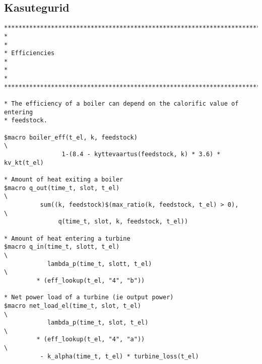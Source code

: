 \subsection{Kasutegurid}
\begin{verbatim}
********************************************************************************
*                                                                              *
* Efficiencies                                                                 *
*                                                                              *
********************************************************************************

* The efficiency of a boiler can depend on the calorific value of entering
* feedstock.

$macro boiler_eff(t_el, k, feedstock)                                          \
                1-(8.4 - kyttevaartus(feedstock, k) * 3.6) * kv_kt(t_el)

* Amount of heat exiting a boiler
$macro q_out(time_t, slot, t_el)                                               \
          sum((k, feedstock)$(max_ratio(k, feedstock, t_el) > 0),              \
               q(time_t, slot, k, feedstock, t_el))

* Amount of heat entering a turbine
$macro q_in(time_t, slott, t_el)                                               \
            lambda_p(time_t, slott, t_el)                                      \
         * (eff_lookup(t_el, "4", "b"))

* Net power load of a turbine (ie output power)
$macro net_load_el(time_t, slot, t_el)                                         \
            lambda_p(time_t, slot, t_el)                                       \
         * (eff_lookup(t_el, "4", "a"))                                        \
          - k_alpha(time_t, t_el) * turbine_loss(t_el)
\end{verbatim}

